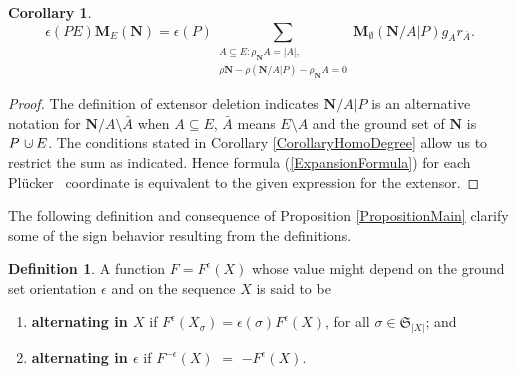 \documentclass[12pt]{article}
\newtheorem{corollary}[theorem]{Corollary}
\theoremstyle{definition}
\newtheorem{definition}[theorem]{Definition}
\newcommand{\dunion}
{\mbox{\hbox{\hskip6pt$\cdot$\hskip-5.50pt$\cup$\hskip2pt}}}
\newcommand{\scomp}[1]{\ensuremath{\overline{#1}}}
\newcommand{\Perms}{\ensuremath{\mathfrak{S}}}
\newcommand{\rank}{{\rho}}%
\newcommand{\Card}[1]{\ensuremath{{\left|#1\right|}}}
\newcommand{\ext}[1]{\ensuremath{\mathbf{#1}}}
\newcommand{\Plucker}{Pl\"{u}cker\ }
\begin{document}
\begin{corollary}
\label{corollaryMESubsetSum}
\begin{equation}
\label{MESubsetSum}
\epsilon(PE)\ext{M}_E(\ext{N})=\epsilon(P)\sum_
             {\begin{array}{c}
                A\subseteq E:
	\rank_{\ext{N}}{A}=\Card{A},\\
	\rank{\ext{N}}-\rank{(\ext{N}/A|P)}-
        \rank_{\ext{N}}{A}=0
               \end{array}}
    \ext{M}_\emptyset(\ext{N}/A|P) g_Ar_{\scomp{A}}.
\end{equation}
\end{corollary}

\begin{proof}

The definition of extensor deletion indicates 
$\ext{N}/A|P$ is an alternative notation
for $\ext{N}/A\setminus\bar{A}$ when $A\subseteq E$,
$\bar{A}$ means $E\setminus A$ and the
ground set of $\ext{N}$ is $P\dunion E$.  The conditions
stated in Corollary \ref{CorollaryHomoDegree}
allow us to restrict the sum as indicated.
Hence
formula (\ref{ExpansionFormula}) for each \Plucker
coordinate is equivalent to the given expression 
for the extensor.
\end{proof}


The following definition and consequence of 
Proposition \ref{PropositionMain} clarify some 
of the sign behavior resulting from the definitions.


\begin{definition}
A function $F=F^\epsilon(X)$ whose value might depend on
the ground set orientation $\epsilon$ and on the sequence $X$ is said to be
\begin{enumerate}
\item \textbf{alternating in $X$} if $F^\epsilon(X_\sigma) = 
\epsilon(\sigma)F^\epsilon(X)$, for all
$\sigma\in\Perms_{\Card{X}}$; and
\item \textbf{alternating in $\epsilon$} if $F^{-\epsilon}(X)$ $=$
$-F^\epsilon(X)$.
\end{enumerate}
\end{definition}
\end{document}
